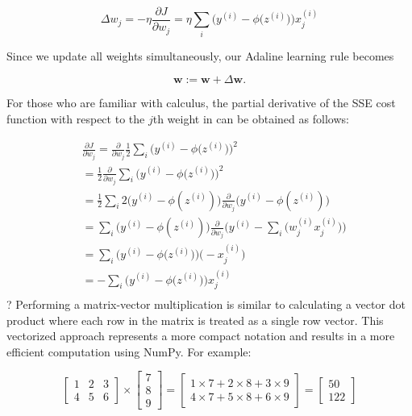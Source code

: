 \documentclass[letterpaper]{report}
\begin{document}
\[
\Delta w_j = - \eta \frac{\partial J}{\partial w_j} = \eta  \sum_i \bigg( y^{(i)} - \phi \big(z^{(i)} \big) \bigg) x_{j}^{(i)}
\]

Since we update all weights simultaneously, our Adaline learning rule becomes

\[
\mathbf{w} := \mathbf{w} + \Delta \mathbf{w}.
\]


For those who are familiar with calculus, the partial derivative of the SSE cost function with respect to the $j$th weight in can be obtained as follows:

\begin{equation*} 
\begin{split}
& \frac{\partial J}{\partial w_j} = \frac{\partial}{\partial w_j} \frac{1}{2} \sum_i \bigg(  y^{(i)} - \phi \big( z^{(i)} \big)  \bigg)^2 \\
& = \frac{1}{2} \frac{\partial}{\partial w_j} \sum_i \bigg(  y^{(i)} - \phi \big( z^{(i)} \big)  \bigg)^2 \\
& = \frac{1}{2} \sum_i 2 \big( y^{(i)} - \phi(z^{(i)})\big)  \frac{\partial}{\partial w_j} \Big( y^{(i)}  - \phi({z^{(i)}}) \Big) \\
& = \sum_i \big( y^{(i)}  - \phi (z^{(i)})   \big) \frac{\partial}{\partial w_j} \Big( y^{(i)} - \sum_i \big(w^{(i)}_{j} x^{(i)}_{j} \big) \Big) \\
& = \sum_i \bigg(  y^{(i)} - \phi \big( z^{(i)} \big)  \bigg) \bigg( - x_{j}^{(i)} \bigg) \\
& = - \sum_i \bigg(  y^{(i)} - \phi \big( z^{(i)} \big)  \bigg) x_{j}^{(i)}  \\
\end{split}
\end{equation*}
?
Performing a matrix-vector multiplication is similar to calculating a vector dot product where each row in the matrix is treated as a single row vector. This vectorized approach represents a more compact notation and results in a more efficient computation using NumPy. For example:

\[
 \begin{bmatrix}
    1 & 2  & 3\\
    4 & 5  & 6
\end{bmatrix} \times  \begin{bmatrix}
    7 \\
    8 \\
    9
\end{bmatrix} =  \begin{bmatrix}
    1 \times 7 + 2 \times 8 + 3 \times 9 \\
    4 \times 7 + 5 \times 8 + 6 \times 9
\end{bmatrix} = \begin{bmatrix}
    50 \\
    122
\end{bmatrix}
\]
\end{document}
